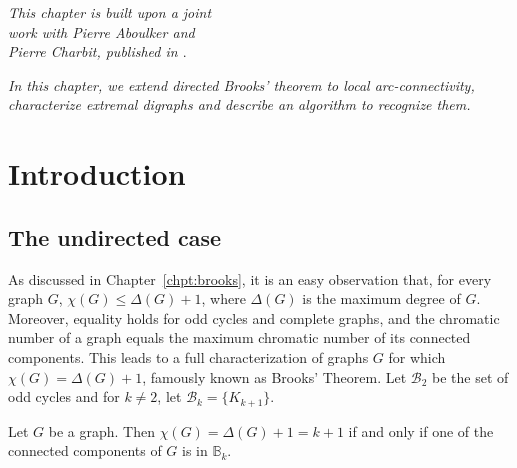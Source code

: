 \begin{flushright}{\slshape    
This chapter is built upon a joint \\
work with Pierre Aboulker and \\
Pierre Charbit, published in \cite{AAC23}}. \\ \medskip
\end{flushright}

\emph{In this chapter, we extend directed Brooks' theorem to local arc-connectivity, characterize extremal digraphs and describe an algorithm to recognize them.}


\newcommand{\htk}{\vec{E\mc{HT}}_{k}}
\newcommand{\hk}{\vec{\mc{H}}_{k}}
\newcommand{\htthree}{\vec{E\mc{HT}}_{3}}
\newcommand{\hthree}{\vec{\mc{H}}_{3}}


\newcommand{\figg}[1]{}

\section{Introduction}



\subsection{The undirected case}



As discussed in Chapter~\ref{chpt:brooks}, it is an easy observation that, for every graph $G$, $\chi(G) \leq  \Delta(G) + 1$, where $\Delta(G)$ is the maximum degree of $G$. 
Moreover, equality holds for odd cycles and complete graphs, and the chromatic number of a graph equals the maximum chromatic number of its connected components. This leads to a full characterization of graphs $G$ for which $\chi(G) = \Delta(G) + 1$, famously known as Brooks' Theorem. 
Let  $\mathcal B_2$ be the set of odd cycles and for $k \neq 2$, let  $\mathcal B_k = \{ K_{k+1}\}$.

\begin{theorem}
    Let $G$ be a graph. Then $\chi(G) = \Delta(G) + 1=k+1$ if and only if one of the connected components of $G$ is in $\mathbb B_k$. 
\end{theorem}

